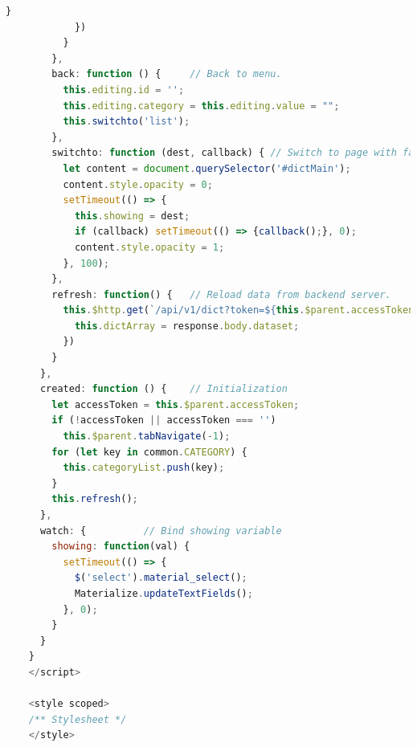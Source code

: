 \documentclass[a4paper, 12pt]{article}
\begin{document}
\begin{lstlisting}[language=javascript, basicstyle=\small\lstfont, showstringspaces=false]
	          }
	        })
	      }
	    },
	    back: function () { 	// Back to menu.
	      this.editing.id = '';
	      this.editing.category = this.editing.value = "";
	      this.switchto('list');
	    },
	    switchto: function (dest, callback) { // Switch to page with fade in/out anime.
	      let content = document.querySelector('#dictMain');
	      content.style.opacity = 0;
	      setTimeout(() => {
	        this.showing = dest;
	        if (callback) setTimeout(() => {callback();}, 0);
	        content.style.opacity = 1;
	      }, 100);
	    },
	    refresh: function() { 	// Reload data from backend server.
	      this.$http.get(`/api/v1/dict?token=${this.$parent.accessToken}`).then((response) => {
	        this.dictArray = response.body.dataset;
	      })
	    }
	  },
	  created: function () { 	// Initialization
	    let accessToken = this.$parent.accessToken;
	    if (!accessToken || accessToken === '')
	      this.$parent.tabNavigate(-1);
	    for (let key in common.CATEGORY) {
	      this.categoryList.push(key);
	    }
	    this.refresh();
	  },
	  watch: { 			// Bind showing variable
	    showing: function(val) {
	      setTimeout(() => {
	        $('select').material_select();
	        Materialize.updateTextFields(); 
	      }, 0);
	    }
	  }
	}
	</script>
	
	<style scoped>
	/** Stylesheet */
	</style>
	\end{lstlisting}
\end{document}
